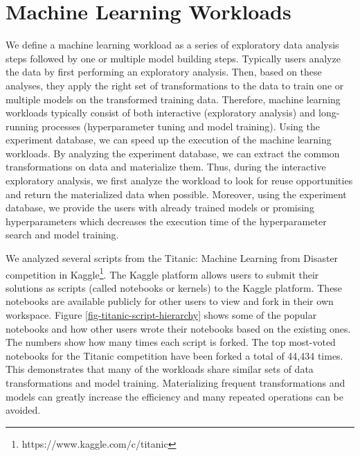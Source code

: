 
\section{Machine Learning Workloads} \label{sec-ml-workloads}
We define a machine learning workload as a series of exploratory data analysis steps followed by one or multiple model building steps.
Typically users analyze the data by first performing an exploratory analysis.
Then, based on these analyses, they apply the right set of transformations to the data to train one or multiple models on the transformed training data.
Therefore, machine learning workloads typically consist of both interactive (exploratory analysis) and long-running processes (hyperparameter tuning and model training).
Using the experiment database, we can speed up the execution of the machine learning workloads.
By analyzing the experiment database, we can extract the common transformations on data and materialize them.
Thus, during the interactive exploratory analysis, we first analyze the workload to look for reuse opportunities and return the materialized data when possible.
Moreover, using the experiment database, we provide the users with already trained models or promising hyperparameters which decreases the execution time of the hyperparameter search and model training.

We analyzed several scripts from the Titanic: Machine Learning from Disaster competition in Kaggle\footnote{https://www.kaggle.com/c/titanic}.
The Kaggle platform allows users to submit their solutions as scripts (called notebooks or kernels) to the Kaggle platform.
These notebooks are available publicly for other users to view and fork in their own workspace.
Figure \ref{fig-titanic-script-hierarchy} shows some of the popular notebooks and how other users wrote their notebooks based on the existing ones.
The numbers show how many times each script is forked.
The top most-voted notebooks for the Titanic competition have been forked a total of 44,434 times.
This demonstrates that many of the workloads share similar sets of data transformations and model training.
Materializing frequent transformations and models can greatly increase the efficiency and many repeated operations can be avoided.

